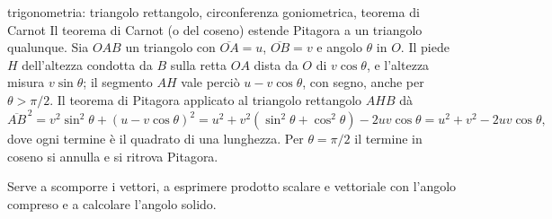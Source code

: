 \documentclass[main.tex]{subfiles}
\begin{document}
\begin{riquadro}{trigonometria: triangolo rettangolo, circonferenza goniometrica, teorema di Carnot}
Il teorema di Carnot (o del coseno) estende Pitagora a un triangolo qualunque. Sia $OAB$ un triangolo con $\overline{OA}=u$, $\overline{OB}=v$ e angolo $\theta$ in $O$. Il piede $H$ dell'altezza condotta da $B$ sulla retta $OA$ dista da $O$ di $v\cos\theta$, e l'altezza misura $v\sin\theta$; il segmento $AH$ vale perciò $u-v\cos\theta$, con segno, anche per $\theta>\pi/2$. Il teorema di Pitagora applicato al triangolo rettangolo $AHB$ dà
\[
\overline{AB}^{\,2}=v^2\sin^2\theta+(u-v\cos\theta)^2=u^2+v^2\left(\sin^2\theta+\cos^2\theta\right)-2uv\cos\theta=u^2+v^2-2uv\cos\theta ,
\]
dove ogni termine è il quadrato di una lunghezza. Per $\theta=\pi/2$ il termine in coseno si annulla e si ritrova Pitagora.

Serve a scomporre i vettori, a esprimere prodotto scalare e vettoriale con l'angolo compreso e a calcolare l'angolo solido.
\end{riquadro}
\end{document}
